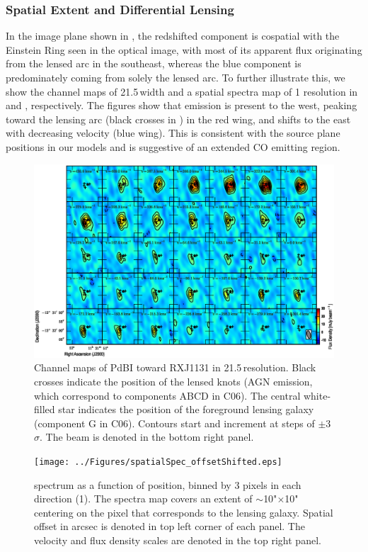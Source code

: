 \documentclass[]{emulateapj}
\begin{document}
\subsubsection{Spatial Extent and Differential Lensing} \label{sec:differential}
In the image plane shown in  , the redshifted component is 
cospatial with the Einstein Ring seen in the
optical image, with most of its apparent flux originating from the lensed arc
in the southeast, whereas the blue component is predominately coming from
solely the lensed arc. To further illustrate this, we show the
channel maps of 21.5\,\kms width and a spatial spectra map of 1 resolution in
 and , respectively. The figures
show that emission
is present to the west, peaking toward the lensing arc (black crosses in
) in the red wing, and shifts to the east with decreasing velocity
(blue wing).
This is consistent with the source plane positions in our models and 
is suggestive of an extended CO emitting region.

\begin{figure}[!htbp]
\centering
\includegraphics[width=1.0\textwidth]{../Figures/co_channel_maps.eps}
\caption{
Channel maps of PdBI \bco toward RXJ1131 in 21.5\,\kms resolution.
Black crosses indicate the position of the lensed knots (AGN emission,
which correspond to components ABCD in C06). The central white-filled
star indicates the position of the foreground lensing galaxy (component G
in C06). Contours start and increment at steps of
$\pm$3$\sigma$. The beam is denoted in the bottom right panel. \label{fig:chanmap}}
\end{figure}

\begin{figure}[!htbp]
\centering
\texttt{[image: ../Figures/spatialSpec\_offsetShifted.eps]}
\caption{
\bco spectrum as a function of position, binned by 3 pixels in each
direction (1).
The spectra map covers an extent of $\sim$10"$\times$10"
centering on the pixel that corresponds to the lensing galaxy.
Spatial offset in arcsec is denoted in top left corner of each panel.
The velocity and flux density scales are denoted in the top right panel.
\label{fig:spatialSpec}}
\end{figure}
\end{document}
